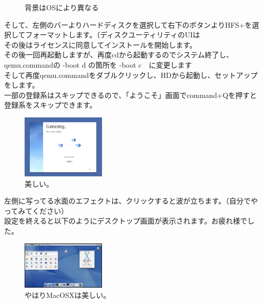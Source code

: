 \documentclass[b5paper,9pt,platex,dvipdfmx]{jsarticle}
\begin{document}
\begin{multicols*}{3}
\begin{figure}[H]
  \caption{背景はOSにより異なる}
\end{figure}
そして、左側のバーよりハードディスクを選択して右下のボタンよりHFS+を選択してフォーマットします。（ディスクユーティリティのUIは\\
その後はライセンスに同意してインストールを開始します。\\
その後一回再起動しますが、再度cdから起動するのでシステム終了し、qemu.commandの -boot d の箇所を -boot c　に変更します\\
そして再度qemu.commandをダブルクリックし、HDから起動し、セットアップをします。\\
一部の登録系はスキップできるので、「ようこそ」画面でcommand+Qを押すと登録系をスキップできます。\\
\begin{figure}[H]
  \centering
  \includegraphics[width=4cm]{osx-connect.png}
  \caption{美しい。}
\end{figure}
左側に写ってる水面のエフェクトは、クリックすると波が立ちます。（自分でやってみてください）\\
設定を終えると以下のようにデスクトップ画面が表示されます。お疲れ様でした。\\
\begin{figure}[H]
  \centering
  \includegraphics[width=4cm]{osxdesktop.png}
  \caption{やはりMacOSXは美しい。}
\end{figure}

\end{multicols*}
\end{document}
